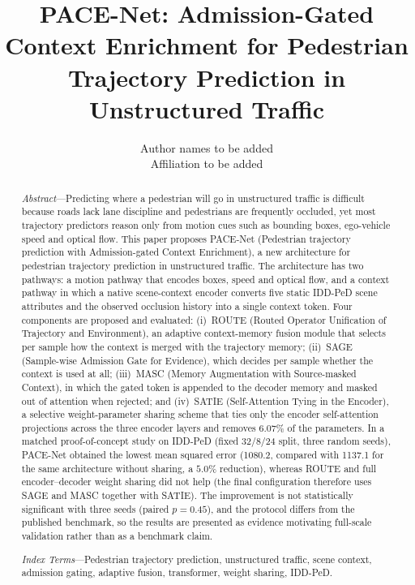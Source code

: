 \documentclass[10pt,twocolumn,a4paper]{article}
\title{\vspace{-0.6em}\Large\bfseries PACE-Net: Admission-Gated Context Enrichment for Pedestrian Trajectory Prediction in Unstructured Traffic}
\author{\small Author names to be added\\[-2pt]\footnotesize Affiliation to be added}
\date{}
\begin{document}
\maketitle
\begin{abstract}
\noindent\textit{Abstract}---Predicting where a pedestrian will go in unstructured traffic is difficult because roads lack lane discipline and pedestrians are frequently occluded, yet most trajectory predictors reason only from motion cues such as bounding boxes, ego-vehicle speed and optical flow. This paper proposes PACE-Net (Pedestrian trajectory prediction with Admission-gated Context Enrichment), a new architecture for pedestrian trajectory prediction in unstructured traffic. The architecture has two pathways: a motion pathway that encodes boxes, speed and optical flow, and a context pathway in which a native scene-context encoder converts five static IDD-PeD scene attributes and the observed occlusion history into a single context token. Four components are proposed and evaluated: (i)~ROUTE (Routed Operator Unification of Trajectory and Environment), an adaptive context-memory fusion module that selects per sample how the context is merged with the trajectory memory; (ii)~SAGE (Sample-wise Admission Gate for Evidence), which decides per sample whether the context is used at all; (iii)~MASC (Memory Augmentation with Source-masked Context), in which the gated token is appended to the decoder memory and masked out of attention when rejected; and (iv)~SATIE (Self-Attention Tying in the Encoder), a selective weight-parameter sharing scheme that ties only the encoder self-attention projections across the three encoder layers and removes $6.07\%$ of the parameters. In a matched proof-of-concept study on IDD-PeD (fixed 32/8/24 split, three random seeds), PACE-Net obtained the lowest mean squared error (1080.2, compared with 1137.1 for the same architecture without sharing, a $5.0\%$ reduction), whereas ROUTE and full encoder--decoder weight sharing did not help (the final configuration therefore uses SAGE and MASC together with SATIE). The improvement is not statistically significant with three seeds (paired $p=0.45$), and the protocol differs from the published benchmark, so the results are presented as evidence motivating full-scale validation rather than as a benchmark claim.
\par\smallskip\noindent\textit{Index Terms}---Pedestrian trajectory prediction, unstructured traffic, scene context, admission gating, adaptive fusion, transformer, weight sharing, IDD-PeD.
\end{abstract}








\end{document}

